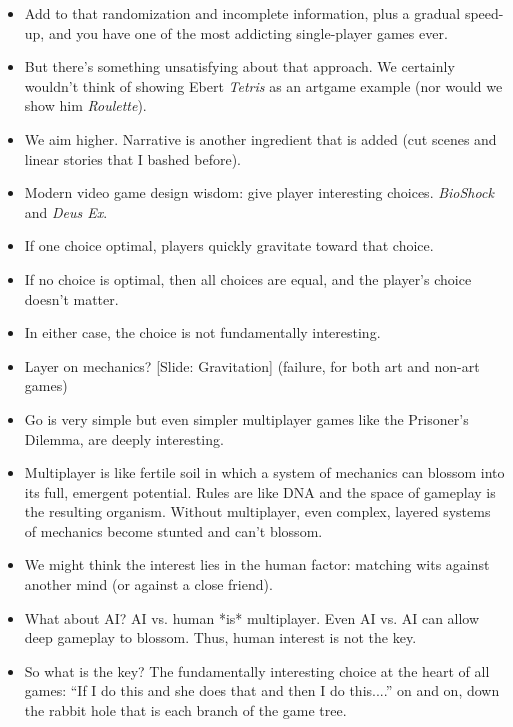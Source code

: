 \documentclass[12pt]{article}
\begin{document}
{\begin{itemize}
\item Add to that randomization and incomplete information, plus a gradual speed-up, and you have one of the most addicting single-player games ever.

\item But there's something unsatisfying about that approach.  We certainly wouldn't think of showing Ebert {\it Tetris} as an artgame example (nor would we show him {\it Roulette}).

\item We aim higher.  Narrative is another ingredient that is added (cut scenes and linear stories that I bashed before).


\item Modern video game design wisdom:  give player interesting choices.  {\it BioShock} and {\it Deus Ex}. 

\item If one choice optimal, players quickly gravitate toward that choice.

\item If no choice is optimal, then all choices are equal, and the player's choice doesn't matter.

\item In either case, the choice is not fundamentally interesting.

\item Layer on mechanics? [Slide: Gravitation] (failure, for both art and non-art games)

\item Go is very simple but even simpler multiplayer games like the Prisoner's Dilemma, are deeply interesting.

\item Multiplayer is like fertile soil in which a system of mechanics can blossom into its full, emergent potential.  Rules are like DNA and the space of gameplay is the resulting organism.  Without multiplayer, even complex, layered systems of mechanics become stunted and can't blossom.

\item We might think the interest lies in the human factor:  matching wits against another mind (or against a close friend).

\item What about AI?  AI vs. human *is* multiplayer.  Even AI vs. AI can allow deep gameplay to blossom.  Thus, human interest is not the key.

\item So what is the key?  The fundamentally interesting choice at the heart of all games:  ``If I do this and she does that and then I do this....'' on and on, down the rabbit hole that is each branch of the game tree. 


\end{itemize}}
\end{document}
